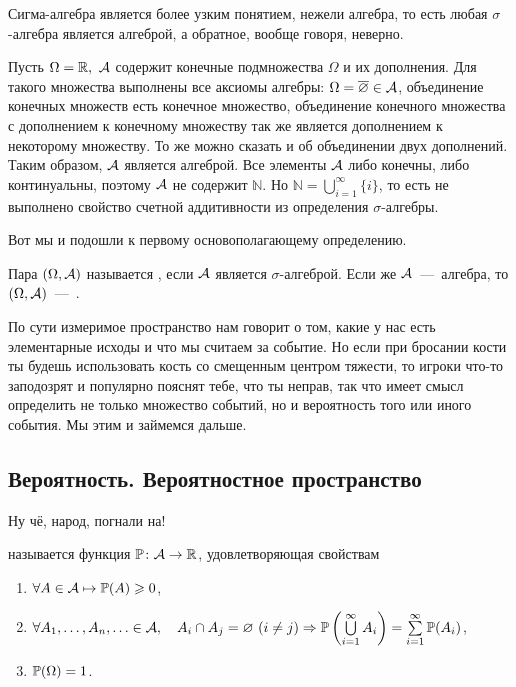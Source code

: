 \documentclass[../TV&MS.tex]{subfiles}
\begin{document}
Сигма-алгебра является более узким понятием, нежели алгебра, то есть любая 
$\sigma$-алгебра является алгеброй, а обратное, вообще говоря, неверно.

\begin{Ex}
	Пусть $\Omega = \mathbb{R},\  \mathcal{A}$ содержит конечные подмножества $\Omega$ и их дополнения. 
	Для такого множества выполнены все аксиомы алгебры: $\Omega = \overline{\varnothing} \in \mathcal{A}$,
	объединение конечных множеств есть конечное множество, объединение конечного множества с 
	дополнением к конечному множеству так же является дополнением к некоторому множеству. 
	То же можно сказать и об объединении двух дополнений. Таким образом, $\mathcal{A}$ является алгеброй.
	Все элементы $\mathcal{A}$ либо конечны, либо континуальны, поэтому $\mathcal{A}$ не содержит $\mathbb{N}$. 
	Но $\mathbb{N} = \bigcup\limits_{i=1}^{\infty}\{i\}$, то есть не выполнено свойство счетной 
	аддитивности из определения $\sigma$-алгебры.
\end{Ex}

	Вот мы и подошли к первому основополагающему определению.

\begin{Def}
	Пара $(\Omega, \mathcal{A})$ называется , если $\mathcal{A}$ является 
	$\sigma$-алгеброй. Если же $\mathcal{A}$~---~алгебра, то  $(\Omega, \mathcal{A})$~---~.
\end{Def}

По сути измеримое пространство нам говорит о том, какие у нас есть элементарные исходы и что мы считаем за событие. 
Но если при бросании кости ты будешь использовать кость со смещенным центром тяжести, то игроки что-то заподозрят и популярно пояснят тебе, что ты неправ, так что имеет смысл определить не только множество событий, но и
вероятность того или иного события. Мы этим и займемся дальше.

\subsection{Вероятность. Вероятностное пространство}
	
\qquad Ну чё, народ, погнали на!

\begin{Def}
	 называется функция $\mathbb{P} \colon \mathcal{A}\rightarrow \mathbb{R}$, 
	удовлетворяющая свойствам
\begin{enumerate}
	\item $\forall A \in \mathcal{A} \mapsto \mathbb{P} (A) \geqslant 0$,
    \item $\forall A_1, \ldots, A_n, \ldots \in \mathcal{A}, \quad A_i \cap A_j  = \varnothing\  
    (i \not= j)  \Rightarrow \mathbb{P} \left(\bigcup\limits_{i=1}^{\infty} A_i\right) = 
    \sum\limits_{i = 1}^{\infty}\mathbb{P}(A_i)$,
	\item $\mathbb{P} (\Omega) = 1$.
\end{enumerate}
\end{Def}
\end{document}
